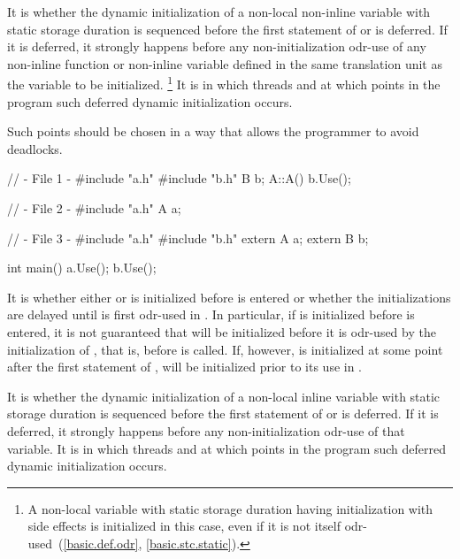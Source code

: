 \pnum
{}%
It is 
whether the dynamic initialization of a
non-local non-inline variable with static storage duration
is sequenced before the first statement of  or is deferred.
If it is deferred, it strongly happens before
any non-initialization odr-use
of any non-inline function or non-inline variable
defined in the same translation unit as the variable to be initialized.%
\footnote{A non-local variable with static storage duration
having initialization
with side effects is initialized in this case,
even if it is not itself odr-used~(\ref{basic.def.odr}, \ref{basic.stc.static}).}
It is 
in which threads and at which points in the program such deferred dynamic initialization occurs.
\begin{note}
Such points should be chosen in a way that allows the programmer to avoid deadlocks.
\end{note}
\begin{example}
\begin{codeblock}
// - File 1 -
#include "a.h"
#include "b.h"
B b;
A::A(){
  b.Use();
}

// - File 2 -
#include "a.h"
A a;

// - File 3 -
#include "a.h"
#include "b.h"
extern A a;
extern B b;

int main() {
  a.Use();
  b.Use();
}
\end{codeblock}

It is 
whether either  or  is
initialized before  is entered or whether the
initializations are delayed until  is first odr-used in
. In particular, if  is initialized before
 is entered, it is not guaranteed that  will be
initialized before it is odr-used by the initialization of , that
is, before  is called. If, however,  is initialized
at some point after the first statement of ,  will
be initialized prior to its use in . \end{example}

\pnum
It is 
whether the dynamic initialization of a
non-local inline variable with static storage duration
is sequenced before the first statement of  or is deferred.
If it is deferred, it strongly happens before
any non-initialization odr-use
of that variable.
It is 
in which threads and at which points in the program such deferred dynamic initialization occurs.

